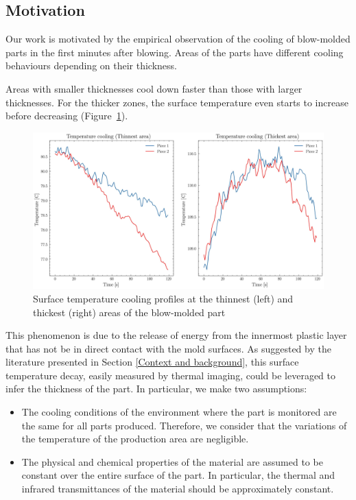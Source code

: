 \subsection{Motivation} \label{Motivation}

Our work is motivated by the empirical observation of the cooling of blow-molded parts in the first minutes after blowing. Areas of the parts have different cooling behaviours depending on their thickness. 

Areas with smaller thicknesses cool down faster than those with larger thicknesses. For the thicker zones, the surface temperature even starts to increase before decreasing (Figure~\ref{fig:temperature_cooling}).
%
\begin{figure}
\centering
\includegraphics[scale=0.55]{images/chapter_4/cooling.eps}
\caption{Surface temperature cooling profiles at the thinnest (left) and thickest (right) areas of the blow-molded part}
\label{fig:temperature_cooling}
\end{figure}
%
This phenomenon is due to the release of energy from the innermost plastic layer that has not be in direct contact with the mold surfaces.
As suggested by the literature presented in Section \ref{Context and background}, this surface temperature decay, easily measured by thermal imaging, could be leveraged to infer the thickness of the part.  
In particular, we make two assumptions:
\begin{itemize}
   \item The cooling conditions of the environment where the part is monitored are the same for all parts produced. Therefore, we consider that the variations of the temperature of the production area are negligible.
   \item The physical and chemical properties of the material are assumed to be constant over the entire surface of the part. In particular, the thermal and infrared transmittances of the material should be approximately constant.
\end{itemize}

